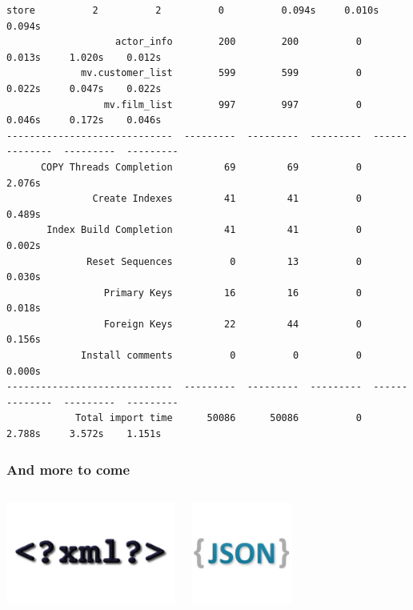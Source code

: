 \documentclass{beamer}
\begin{document}
\begin{frame}[fragile]
\begin{Verbatim}[fontsize=\tiny]
                        store          2          2          0          0.094s     0.010s    0.094s
                   actor_info        200        200          0          0.013s     1.020s    0.012s
             mv.customer_list        599        599          0          0.022s     0.047s    0.022s
                 mv.film_list        997        997          0          0.046s     0.172s    0.046s
-----------------------------  ---------  ---------  ---------  --------------  ---------  ---------
      COPY Threads Completion         69         69          0          2.076s                     
               Create Indexes         41         41          0          0.489s                     
       Index Build Completion         41         41          0          0.002s                     
              Reset Sequences          0         13          0          0.030s                     
                 Primary Keys         16         16          0          0.018s                     
                 Foreign Keys         22         44          0          0.156s                     
             Install comments          0          0          0          0.000s                     
-----------------------------  ---------  ---------  ---------  --------------  ---------  ---------
            Total import time      50086      50086          0          2.788s     3.572s    1.151s
\end{Verbatim}
\end{frame}

\begin{frame}
  \frametitle{And more to come}

  
  \begin{columns}[c]
    \begin{center}
      \includegraphics[height=9em]{xml.png}
    \end{center}
    \begin{center}
      \includegraphics[height=9em]{logo-json.png}
    \end{center}
  \end{columns}
\end{frame}
\end{document}
